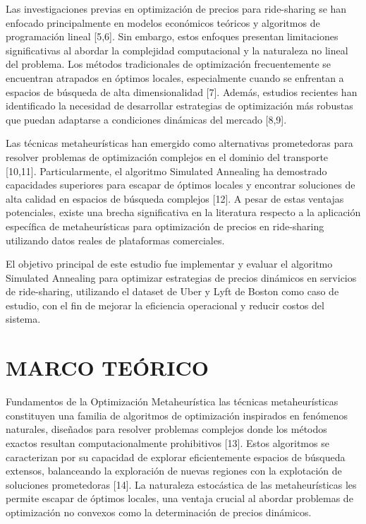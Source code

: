 \documentclass[12pt,a4paper,twocolumn]{article}
\begin{document}
Las investigaciones previas en optimización de precios para ride-sharing se han enfocado principalmente en modelos económicos teóricos y algoritmos de programación lineal [5,6]. Sin embargo, estos enfoques presentan limitaciones significativas al abordar la complejidad computacional y la naturaleza no lineal del problema. Los métodos tradicionales de optimización frecuentemente se encuentran atrapados en óptimos locales, especialmente cuando se enfrentan a espacios de búsqueda de alta dimensionalidad [7]. Además, estudios recientes han identificado la necesidad de desarrollar estrategias de optimización más robustas que puedan adaptarse a condiciones dinámicas del mercado [8,9].

Las técnicas metaheurísticas han emergido como alternativas prometedoras para resolver problemas de optimización complejos en el dominio del transporte [10,11]. Particularmente, el algoritmo Simulated Annealing ha demostrado capacidades superiores para escapar de óptimos locales y encontrar soluciones de alta calidad en espacios de búsqueda complejos [12]. A pesar de estas ventajas potenciales, existe una brecha significativa en la literatura respecto a la aplicación específica de metaheurísticas para optimización de precios en ride-sharing utilizando datos reales de plataformas comerciales.

El objetivo principal de este estudio fue implementar y evaluar el algoritmo Simulated Annealing para optimizar estrategias de precios dinámicos en servicios de ride-sharing, utilizando el dataset de Uber y Lyft de Boston como caso de estudio, con el fin de mejorar la eficiencia operacional y reducir costos del sistema.

\section{MARCO TEÓRICO}

Fundamentos de la Optimización Metaheurística las técnicas metaheurísticas constituyen una familia de algoritmos de optimización inspirados en fenómenos naturales, diseñados para resolver problemas complejos donde los métodos exactos resultan computacionalmente prohibitivos [13]. Estos algoritmos se caracterizan por su capacidad de explorar eficientemente espacios de búsqueda extensos, balanceando la exploración de nuevas regiones con la explotación de soluciones prometedoras [14]. La naturaleza estocástica de las metaheurísticas les permite escapar de óptimos locales, una ventaja crucial al abordar problemas de optimización no convexos como la determinación de precios dinámicos.
\end{document}

